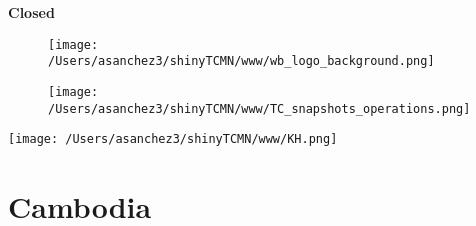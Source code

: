 \documentclass{article}\usepackage[]{graphicx}\usepackage[]{color}
\begin{document}
\begin{minipage}[b]{0.99\textwidth}
  \raggedright{\color{white!30!blue} \textbf{\large Closed}}
  \vspace*{0.3cm}
  
{\scriptsize
{}
}

  \vspace*{0.2cm}
\end{minipage}

\newpage
\begin{figure}
  \vspace{-3ex} %
  \hspace{-7ex} %
  \texttt{[image: /Users/asanchez3/shinyTCMN/www/wb\_logo\_background.png]}
\end{figure}
\begin{figure}
  \begin{minipage}[t]{0.99\textwidth} %
      \vspace{-30ex}
      \hspace{-2ex}
      \raggedright{\texttt{[image: /Users/asanchez3/shinyTCMN/www/TC\_snapshots\_operations.png]}}
  \end{minipage}
\end{figure}
%
\begin{minipage}[t]{0.99\textwidth} %
  \vspace{-1.5cm}
  \begin{minipage}[c]{0.36\textwidth} 
    \begin{minipage}[c]{0.28\textwidth} %
      \texttt{[image: /Users/asanchez3/shinyTCMN/www/KH.png]}
    \end{minipage}
    \begin{minipage}[c]{0.70\textwidth} %
      \section*{\color{blue!40!black}Cambodia}
    \end{minipage}
  \end{minipage}
  \begin{minipage}[c]{0.63\textwidth}
  \end{minipage}  
\end{minipage} %
\end{document}
